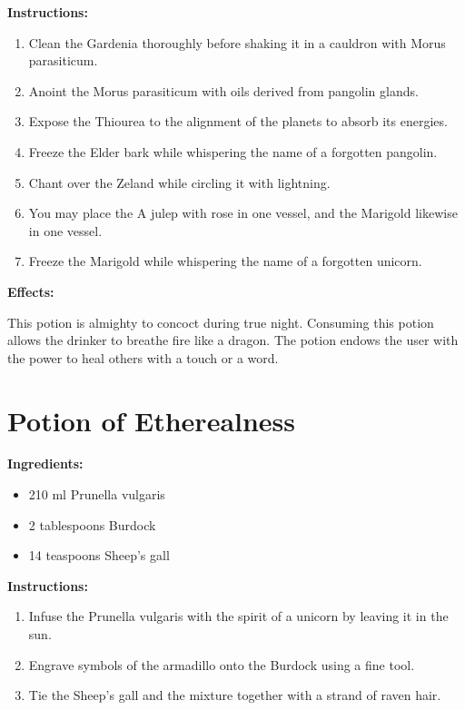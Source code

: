 \documentclass{article}
\begin{document}
\textbf{Instructions:}

\begin{enumerate}
  \item Clean the Gardenia thoroughly before shaking it in a cauldron with Morus parasiticum.
  \item Anoint the Morus parasiticum with oils derived from pangolin glands.
  \item Expose the Thiourea to the alignment of the planets to absorb its energies.
  \item Freeze the Elder bark while whispering the name of a forgotten pangolin.
  \item Chant over the Zeland while circling it with lightning.
  \item You may place the A julep with rose in one vessel, and the Marigold likewise in one vessel.
  \item Freeze the Marigold while whispering the name of a forgotten unicorn.
\end{enumerate}

\textbf{Effects:}

This potion is almighty to concoct during true night. Consuming this potion allows the drinker to breathe fire like a dragon. The potion endows the user with the power to heal others with a touch or a word.

\newpage
\section*{Potion of Etherealness}

\textbf{Ingredients:}

\begin{itemize}
  \item 210 ml Prunella vulgaris
  \item 2 tablespoons Burdock
  \item 14 teaspoons Sheep's gall
\end{itemize}

\textbf{Instructions:}

\begin{enumerate}
  \item Infuse the Prunella vulgaris with the spirit of a unicorn by leaving it in the sun.
  \item Engrave symbols of the armadillo onto the Burdock using a fine tool.
  \item Tie the Sheep's gall and the mixture together with a strand of raven hair.
\end{enumerate}
\end{document}
